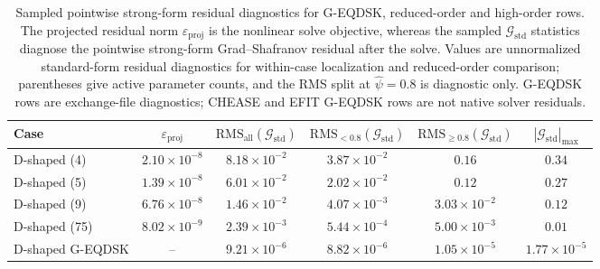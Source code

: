 \documentclass[final, 3p, times]{elsarticle}
\newcommand{\tableformat}{\centering\small}
\begin{document}
\begin{table}[tb]
    \caption{Sampled pointwise strong-form residual diagnostics for G-EQDSK, reduced-order and high-order rows. The projected residual norm $\varepsilon_{\mathrm{proj}}$ is the nonlinear solve objective, whereas the sampled $\mathcal{G}_{\mathrm{std}}$ statistics diagnose the pointwise strong-form Grad--Shafranov residual after the solve. Values are unnormalized standard-form residual diagnostics for within-case localization and reduced-order comparison; parentheses give active parameter counts, and the RMS split at $\hat{\psi}=0.8$ is diagnostic only. G-EQDSK rows are exchange-file diagnostics; CHEASE and EFIT G-EQDSK rows are not native solver residuals.}
    \tableformat
    \begin{tabular}{l c c c c c}
        \hline
        Case             & $\varepsilon_{\mathrm{proj}}$ & $\mathrm{RMS}_{\mathrm{all}}(\mathcal{G}_{\mathrm{std}})$ & $\mathrm{RMS}_{<0.8}(\mathcal{G}_{\mathrm{std}})$ & $\mathrm{RMS}_{\geq0.8}(\mathcal{G}_{\mathrm{std}})$ & $|\mathcal{G}_{\mathrm{std}}|_{\max}$ \\
        \hline
        D-shaped (4)     & $2.10\times 10^{-8}$          & $8.18\times 10^{-2}$                                      & $3.87\times 10^{-2}$                              & $0.16$                                               & $0.34$                                \\
        D-shaped (5)     & $1.39\times 10^{-8}$          & $6.01\times 10^{-2}$                                      & $2.02\times 10^{-2}$                              & $0.12$                                               & $0.27$                                \\
        D-shaped (9)     & $6.76\times 10^{-8}$          & $1.46\times 10^{-2}$                                      & $4.07\times 10^{-3}$                              & $3.03\times 10^{-2}$                                 & $0.12$                                \\
        D-shaped (75)    & $8.02\times 10^{-9}$          & $2.39\times 10^{-3}$                                      & $5.44\times 10^{-4}$                              & $5.00\times 10^{-3}$                                 & $0.01$                                \\
        D-shaped G-EQDSK & --                            & $9.21\times 10^{-6}$                                      & $8.82\times 10^{-6}$                              & $1.05\times 10^{-5}$                                 & $1.77\times 10^{-5}$                  \\

\end{tabular}
\end{table}
\end{document}
